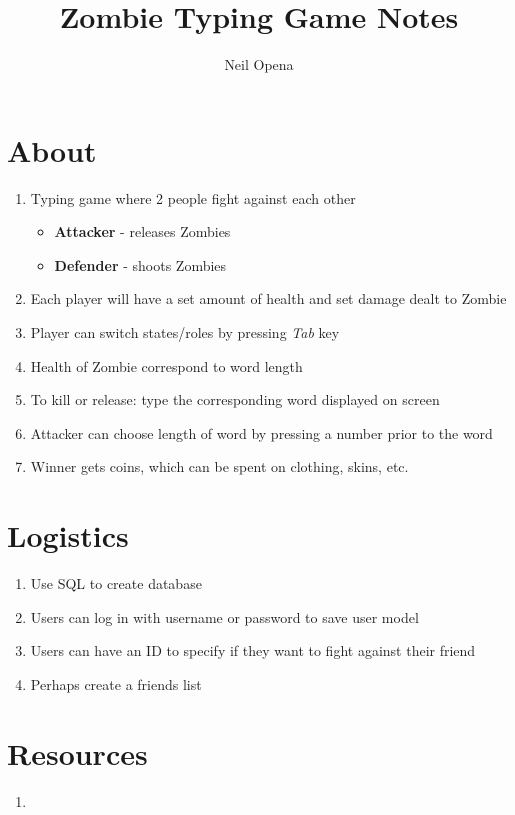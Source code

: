 \documentclass[10pt]{article}
\title{Zombie Typing Game Notes}
\author{Neil Opena}
\date{}
\begin{document}
\maketitle

\section*{About}
\begin{enumerate}
    \item Typing game where 2 people fight against each other
    \begin{itemize}
        \item \textbf{Attacker} - releases Zombies
        \item \textbf{Defender} - shoots Zombies
    \end{itemize}
    \item Each player will have a set amount of health and set damage dealt to Zombie
    \item Player can switch states/roles by pressing \textit{Tab} key
    \item Health of Zombie correspond to word length
    \item To kill or release: type the corresponding word displayed on screen
    \item Attacker can choose length of word by pressing a number prior to the word
    \item Winner gets coins, which can be spent on clothing, skins, etc.
\end{enumerate}

\section*{Logistics}
\begin{enumerate}
    \item Use SQL to create database
    \item Users can log in with username or password to save user model
    \item Users can have an ID to specify if they want to fight against their friend
    \item Perhaps create a friends list
\end{enumerate}

\section*{Resources}
\begin{enumerate}
    \item 
\end{enumerate}
\end{document}
